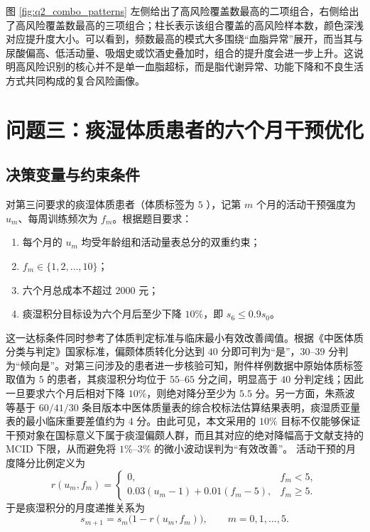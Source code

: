 \documentclass{MathorCupmodeling}
\begin{document}
		图 \ref{fig:q2_combo_patterns} 左侧给出了高风险覆盖数最高的二项组合，右侧给出了高风险覆盖数最高的三项组合；柱长表示该组合覆盖的高风险样本数，颜色深浅对应提升度大小。可以看到，频数最高的模式大多围绕“血脂异常”展开，而当其与尿酸偏高、低活动量、吸烟史或饮酒史叠加时，组合的提升度会进一步上升。这说明高风险识别的核心并不是单一血脂超标，而是脂代谢异常、功能下降和不良生活方式共同构成的复合风险画像。

	\section{问题三：痰湿体质患者的六个月干预优化}
		\subsection{决策变量与约束条件}
			对第三问要求的痰湿体质患者（体质标签为 $5$ ），记第 $m$ 个月的活动干预强度为 $u_m$、每周训练频次为 $f_m$。根据题目要求：
		\begin{enumerate}
				\item 每个月的 $u_m$ 均受年龄组和活动量表总分的双重约束；
				\item $f_m\in\{1,2,\dots,10\}$；
				\item 六个月总成本不超过 $2000$ 元；
				\item 痰湿积分目标设为六个月后至少下降 $10\%$，即 $s_6\le 0.9 s_0$。
			\end{enumerate}
		这一达标条件同时参考了体质判定标准与临床最小有效改善阈值。根据《中医体质分类与判定》国家标准，偏颇体质转化分达到 $40$ 分即可判为“是”，$30$--$39$ 分判为“倾向是”\cite{ref6}。对第三问涉及的患者进一步核验可知，附件样例数据中原始体质标签取值为 $5$ 的患者，其痰湿积分均位于 $55$--$65$ 分之间，明显高于 $40$ 分判定线；因此一旦要求六个月后相对下降 $10\%$，则绝对降分至少为 $5.5$ 分。另一方面，朱燕波等基于 $60/41/30$ 条目版本中医体质量表的综合校标法估算结果表明，痰湿质亚量表的最小临床重要差值约为 $4$ 分\cite{ref5}。由此可见，本文采用的 $10\%$ 目标不仅能够保证干预对象在国标意义下属于痰湿偏颇人群，而且其对应的绝对降幅高于文献支持的 MCID 下限，从而避免将 $1\%$--$3\%$ 的微小波动误判为“有效改善”。
			活动干预的月度降分比例定义为
		\begin{equation}
				r(u_m,f_m)=
				\begin{cases}
				0, & f_m<5,\\
				0.03(u_m-1)+0.01(f_m-5), & f_m\ge 5.
			\end{cases}
		\end{equation}
			于是痰湿积分的月度递推关系为
		\begin{equation}
			s_{m+1}=s_m\bigl(1-r(u_m,f_m)\bigr),\qquad m=0,1,\dots,5.
		\end{equation}
	
\end{document}
